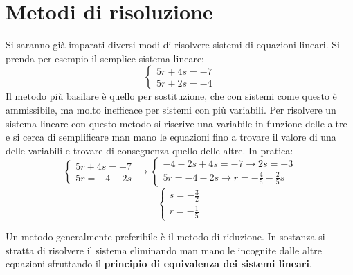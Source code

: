 \section{Metodi di risoluzione}
Si saranno già imparati diversi modi di risolvere sistemi di equazioni lineari. Si prenda per esempio il semplice sistema lineare:
\[
    \begin{cases}
        5r + 4s = -7 \\
        5r + 2s = -4
    \end{cases}
\]
Il metodo più basilare è quello per sostituzione, che con sistemi come questo è ammissibile, ma molto inefficace per sistemi con più variabili. Per risolvere un sistema lineare con questo metodo si riscrive una variabile in funzione delle altre e si cerca di semplificare man mano le equazioni fino a trovare il valore di una delle variabili e trovare di conseguenza quello delle altre. In pratica:
\[
    \begin{cases}
        5r + 4s = -7 \\
        5r = -4 - 2s
    \end{cases}
    \rightarrow
    \begin{cases}
        -4 - 2s + 4s = -7 \rightarrow 2s = -3\\
        5r = -4 - 2s \rightarrow r = -\frac{4}{5} - \frac{2}{5}s
    \end{cases}
\]
\[
    \begin{cases}
        s = -\frac{3}{2} \\
        r = -\frac{1}{5}
    \end{cases}
\]

Un metodo generalmente preferibile è il metodo di riduzione. In sostanza si stratta di risolvere il sistema eliminando man mano le incognite dalle altre equazioni sfruttando il \textbf{principio di equivalenza dei sistemi lineari}.

